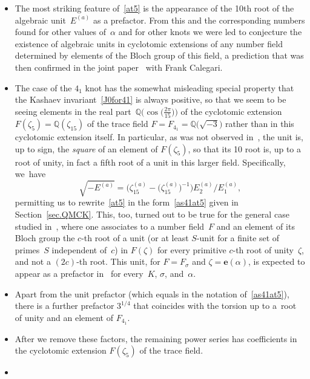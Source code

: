 \documentclass[pdftex]{sigma}
\numberwithin{equation}{section}
\def\z{\zeta}
\def\e{\mathbf{e}}
\def\a{\alpha}
\def\Q{\mathbb Q}
\def\e{\mathbf{e}}
\def\a{\alpha}
\def\z{\zeta}
\def\s{\sigma}
\def\ve{\varepsilon}
\def\vve{E}
\begin{document}
\begin{itemize}\itemsep=0pt
\item[(a)]
 The most striking feature of~\eqref{at5} is the appearance of the 10th root of the
 algebraic unit~$\vve^{(a)}$ as a prefactor. From this and the corresponding numbers
 found for other values of~$\a$ and for other knots we were led to conjecture the
 existence of algebraic units in cyclotomic extensions of any number field determined
 by elements of the Bloch group of this field, a prediction that was then confirmed
 in the joint paper~\cite{CGZ} with Frank Calegari.
\item[(b)]
 The case of the $4_1$ knot has the somewhat misleading special property
 that the Kashaev invariant~\eqref{J0for41} is always positive, so that we seem to be
 seeing elements in the real part~${\Q\bigl(\cos\bigl(\frac{2\pi}{15}\bigr)\bigr)}$ of
 the cyclotomic extension $F(\z_5)=\Q(\z_{15})$ of the trace field
 $F=F_{4_1}=\Q\big(\sqrt{-3}\big)$ rather than in this cyclotomic extension itself. In
 particular, as was not observed in~\cite{Za:QMF}, the unit \smash{$\vve^{(a)}$} is, up to
 sign, the \emph{square} of an element of $F(\z_5)$, so that its 10 root is, up to
 a root of unity, in fact a fifth root of a unit in this larger field. Specifically,
 we~have
 \[\sqrt{-\vve^{(a)}}=\big(\z_{15}^{(a)}- \big(\z_{15}^{(a)}\big)^{-1}\big) \vve^{(a)}_2/\vve^{(a)}_1,\]
 permitting us to rewrite~\eqref{at5} in the form~\eqref{as41at5} given in
 Section~\ref{sec.QMCK}. This, too, turned out to be true for the general case studied
 in~\cite{CGZ}, where one associates to a number field~$F$ and an element of its
 Bloch group the $c$-th root of a unit (or at least $S$-unit for a finite set of
 primes~$S$ independent of~$c$) in $F(\z)$ for every primitive $c$-th root of
 unity~$\z$, and not a $(2c)$-th root. This unit, for $F=F_\s$ and $\z=\e(\a)$, is
 expected to appear as a prefactor in~\smash{$\Phi_\a^{(K,\s)}(h)$} for every~$K$, $\s$, and~$\a$.
\item[(c)]
 Apart from the unit prefactor \smash{$\sqrt{-\vve^{(a)}}$} (which equals \smash{$\ve_{a/5}$} in the
 notation of~\eqref{as41at5}), there is a further prefactor $3^{1/4}$ that coincides
 with the torsion  up to a~root of unity and
 an element of $F_{4_1}$.
\item[(d)]
 After we remove these factors, the remaining power series has coefficients in the
 cyclotomic extension $F(\z_5)$ of the trace field.
\item[(e)]

\end{itemize}
\end{document}
